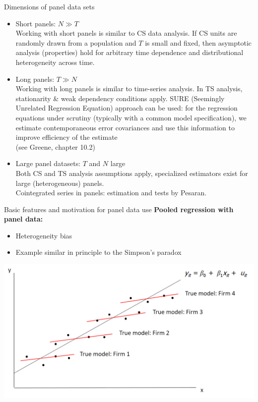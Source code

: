 \documentclass[usenames,dvipsnames]{beamer}
\begin{document}
\begin{frame}{Dimensions of panel data sets}
\footnotesize
\begin{itemize}
\item Short panels: $N \gg T$ \\
Working with short panels is similar to CS data analysis. If CS units are randomly drawn from a population and $T$ is small and fixed, then asymptotic analysis (properties) hold for arbitrary time dependence and distributional heterogeneity across time.
\medskip
\item Long panels: $T \gg N$ \\
Working with long panels is similar to time-series analysis. In TS analysis, stationarity \& weak dependency conditions apply. SURE (Seemingly Unrelated Regression Equation) approach can be used: for the regression equations under scrutiny (typically with a common model specification), we estimate contemporaneous error covariances and use this information to improve efficiency of the estimate \\(see Greene, chapter 10.2)
\medskip
\item Large panel datasets: $T$ and $N$ large\\
Both CS and TS analysis assumptions apply, specialized estimators exist for large (heterogeneous) panels.\\Cointegrated series in panels: estimation and tests by Pesaran.
\end{itemize}
\end{frame}
\begin{frame}{Basic features and motivation for panel data use}
\textbf{Pooled regression with panel data:} \\ \medskip
\begin{itemize}
    \item Heterogeneity bias
    \medskip
    \item Example similar in principle to the Simpson's paradox
\end{itemize}
\medskip
\includegraphics[width=\textwidth]{./img/Obrazek4}
\end{frame}
\end{document}
